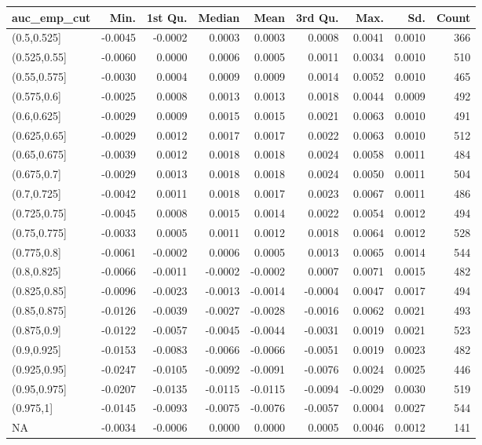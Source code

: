 
\begin{tabular}{l|r|r|r|r|r|r|r|r}
\hline
auc\_emp\_cut & Min. & 1st Qu. & Median & Mean & 3rd Qu. & Max. & Sd. & Count\\
\hline
(0.5,0.525] & -0.0045 & -0.0002 & 0.0003 & 0.0003 & 0.0008 & 0.0041 & 0.0010 & 366\\
\hline
(0.525,0.55] & -0.0060 & 0.0000 & 0.0006 & 0.0005 & 0.0011 & 0.0034 & 0.0010 & 510\\
\hline
(0.55,0.575] & -0.0030 & 0.0004 & 0.0009 & 0.0009 & 0.0014 & 0.0052 & 0.0010 & 465\\
\hline
(0.575,0.6] & -0.0025 & 0.0008 & 0.0013 & 0.0013 & 0.0018 & 0.0044 & 0.0009 & 492\\
\hline
(0.6,0.625] & -0.0029 & 0.0009 & 0.0015 & 0.0015 & 0.0021 & 0.0063 & 0.0010 & 491\\
\hline
(0.625,0.65] & -0.0029 & 0.0012 & 0.0017 & 0.0017 & 0.0022 & 0.0063 & 0.0010 & 512\\
\hline
(0.65,0.675] & -0.0039 & 0.0012 & 0.0018 & 0.0018 & 0.0024 & 0.0058 & 0.0011 & 484\\
\hline
(0.675,0.7] & -0.0029 & 0.0013 & 0.0018 & 0.0018 & 0.0024 & 0.0050 & 0.0011 & 504\\
\hline
(0.7,0.725] & -0.0042 & 0.0011 & 0.0018 & 0.0017 & 0.0023 & 0.0067 & 0.0011 & 486\\
\hline
(0.725,0.75] & -0.0045 & 0.0008 & 0.0015 & 0.0014 & 0.0022 & 0.0054 & 0.0012 & 494\\
\hline
(0.75,0.775] & -0.0033 & 0.0005 & 0.0011 & 0.0012 & 0.0018 & 0.0064 & 0.0012 & 528\\
\hline
(0.775,0.8] & -0.0061 & -0.0002 & 0.0006 & 0.0005 & 0.0013 & 0.0065 & 0.0014 & 544\\
\hline
(0.8,0.825] & -0.0066 & -0.0011 & -0.0002 & -0.0002 & 0.0007 & 0.0071 & 0.0015 & 482\\
\hline
(0.825,0.85] & -0.0096 & -0.0023 & -0.0013 & -0.0014 & -0.0004 & 0.0047 & 0.0017 & 494\\
\hline
(0.85,0.875] & -0.0126 & -0.0039 & -0.0027 & -0.0028 & -0.0016 & 0.0062 & 0.0021 & 493\\
\hline
(0.875,0.9] & -0.0122 & -0.0057 & -0.0045 & -0.0044 & -0.0031 & 0.0019 & 0.0021 & 523\\
\hline
(0.9,0.925] & -0.0153 & -0.0083 & -0.0066 & -0.0066 & -0.0051 & 0.0019 & 0.0023 & 482\\
\hline
(0.925,0.95] & -0.0247 & -0.0105 & -0.0092 & -0.0091 & -0.0076 & 0.0024 & 0.0025 & 446\\
\hline
(0.95,0.975] & -0.0207 & -0.0135 & -0.0115 & -0.0115 & -0.0094 & -0.0029 & 0.0030 & 519\\
\hline
(0.975,1] & -0.0145 & -0.0093 & -0.0075 & -0.0076 & -0.0057 & 0.0004 & 0.0027 & 544\\
\hline
NA & -0.0034 & -0.0006 & 0.0000 & 0.0000 & 0.0005 & 0.0046 & 0.0012 & 141\\
\hline
\end{tabular}
